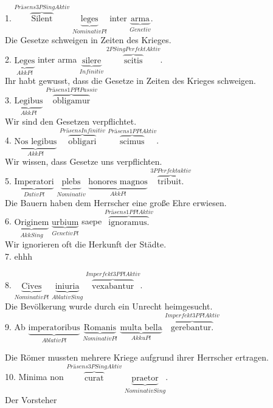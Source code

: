 \documentclass[a4paper]{article}
\newcommand{\ann}[2]{$\underbrace{\text{#1}}_{#2}$}
\newcommand{\ovv}[2]{$\overbrace{\text{#1}}^{#2}$}
\begin{document}
1. \ovv{Silent}{Präsens 3P Sing Aktiv} \ann{leges}{Nominativ Pl} inter \ann{arma}{Genetiv}. \\

Die Gesetze schweigen in Zeiten des Krieges. \\

2. \ann{Leges}{Akk Pl} inter arma \ann{silere}{Infinitiv} \ovv{scitis}{2P Sing Perfekt Aktiv}. \\

Ihr habt gewusst, dass die Gesetze in Zeiten des Krieges schweigen. \\

3. \ann{Legibus}{Akk Pl} \ovv{obligamur}{Präsens 1P Pl Passiv} \\

Wir sind den Gesetzen verpflichtet. \\

4. \ann{Nos legibus}{Akk Pl} \ovv{obligari}{Präsens Infinitiv} \ovv{scimus}{Präsens 1P Pl Aktiv}. \\

Wir wissen, dass Gesetze uns verpflichten. \\

5. \ann{Imperatori}{Dativ Pl} \ann{plebs}{Nominativ} \ann{honores magnos}{Akk Pl} \ovv{tribuit.}{3P Perfekt aktiv} \\

Die Bauern haben dem Herrscher eine große Ehre erwiesen. \\

6. \ann{Originem}{Akk Sing} \ann{urbium}{Genetiv Pl} saepe \ovv{ignoramus.}{Präsens 1P Pl Aktiv} \\

Wir ignorieren oft die Herkunft der Städte. \\

7. ehhh

8. \ann{Cives}{Nominativ Pl} \ann{iniuria}{Ablativ Sing} \ovv{vexabantur}{Imperfekt 3P Pl Aktiv}. \\

Die Bevölkerung wurde durch ein Unrecht heimgesucht. \\

9. Ab \ann{imperatoribus}{Ablativ Pl} \ann{Romanis}{Nominativ Pl} \ann{multa bella}{Akku Pl} \ovv{gerebantur.}{Imperfekt 3P Pl Aktiv} \

Die Römer mussten mehrere Kriege aufgrund ihrer Herrscher ertragen. \\

10. Minima non \ovv{curat}{Präsens 3P Sing Aktiv} \ann{praetor}{Nominativ Sing}. \\

Der Vorsteher
\end{document}
